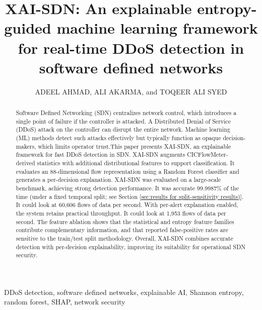 \documentclass{ieeeaccess}
\begin{document}



\title{XAI-SDN: An explainable entropy-guided machine learning framework for real-time DDoS detection in software defined networks}

\author{\uppercase{Adeel Ahmad},
\uppercase{Ali Akarma}, and \uppercase{Toqeer Ali Syed}}

\address[1]{AI Center, Faculty of Computer and Information Systems, Islamic University of Madinah, Madinah 42351, Saudi Arabia}
\address[2]{AI V\&V Lab, King Fahd University of Petroleum and Minerals, Dhahran, Saudi Arabia}


\begin{abstract}
Software Defined Networking (SDN) centralizes network control, which introduces a single point of failure if the controller is attacked. A Distributed Denial of Service (DDoS) attack on the controller can disrupt the entire network. Machine learning (ML) methods detect such attacks effectively but typically function as opaque decision-makers, which limits operator trust.This paper presents XAI-SDN, an explainable framework for fast DDoS detection in SDN. XAI-SDN augments CICFlowMeter-derived statistics with additional distributional features to support classification. It evaluates an 88-dimensional flow representation using a Random Forest classifier and generates a per-decision explanation.
XAI-SDN was evaluated on a large-scale benchmark, achieving strong detection performance. It was accurate 99.9987\% of the time (under a fixed temporal split; see Section \ref{sec:results for split-sensitivity results)}. It could look at 60,606 flows of data per second. With per-alert explanation enabled, the system retains practical throughput. It could look at 1,953 flows of data per second. The feature ablation shows that the statistical and entropy feature families contribute complementary information, and that reported false-positive rates are sensitive to the train/test split methodology. Overall, XAI-SDN combines accurate detection with per-decision explainability, improving its suitability for operational SDN security.
\end{abstract}

\begin{keywords}
DDoS detection, software defined networks, explainable AI, Shannon entropy, random forest, SHAP, network security
\end{keywords}
\end{document}
